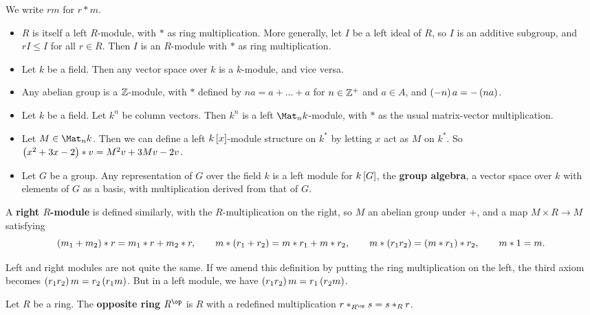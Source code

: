 We write $ rm $ for $ r * m $.

\begin{example*}
\hfill
\begin{itemize}
\item $ R $ is itself a left $ R $-module, with $ * $ as ring multiplication. More generally, let $ I $ be a left ideal of $ R $, so $ I $ is an additive subgroup, and $ rI \le I $ for all $ r \in R $. Then $ I $ is an $ R $-module with $ * $ as ring multiplication.
\item Let $ k $ be a field. Then any vector space over $ k $ is a $ k $-module, and vice versa.
\item Any abelian group is a $ \mathbb{Z} $-module, with $ * $ defined by $ na = a + \dots + a $ for $ n \in \mathbb{Z}^+ $ and $ a \in A $, and $ \br{-n}a = -\br{na} $.
\item Let $ k $ be a field. Let $ k^n $ be column vectors. Then $ k^n $ is a left $ \Mat_n k $-module, with $ * $ as the usual matrix-vector multiplication.
\item Let $ M \in \Mat_n k $. Then we can define a left $ k\sbr{x} $-module structure on $ k^* $ by letting $ x $ act as $ M $ on $ k^* $. So $ \br{x^2 + 3x - 2} * v = M^2v + 3Mv - 2v $.
\item Let $ G $ be a group. Any representation of $ G $ over the field $ k $ is a left module for $ k\sbr{G} $, the \textbf{group algebra}, a vector space over $ k $ with elements of $ G $ as a basis, with multiplication derived from that of $ G $.
\end{itemize}
\end{example*}

\begin{definition}
A \textbf{right $ R $-module} is defined similarly, with the $ R $-multiplication on the right, so $ M $ an abelian group under $ + $, and a map $ M \times R \to M $ satisfying
$$ \br{m_1 + m_2} * r = m_1 * r + m_2 * r, \qquad m * \br{r_1 + r_2} = m * r_1 + m * r_2, \qquad m * \br{r_1r_2} = \br{m * r_1} * r_2, \qquad m * 1 = m. $$
\end{definition}

Left and right modules are not quite the same. If we amend this definition by putting the ring multiplication on the left, the third axiom becomes $ \br{r_1r_2}m = r_2\br{r_1m} $. But in a left module, we have $ \br{r_1r_2}m = r_1\br{r_2m} $.

\begin{definition}
Let $ R $ be a ring. The \textbf{opposite ring} $ R^{\op} $ is $ R $ with a redefined multiplication $ r *_{R^{\op}} s = s *_R r $.
\end{definition}

